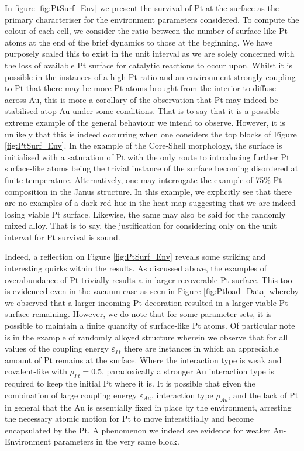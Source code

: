 In figure \ref{fig:PtSurf_Env} we present the survival of Pt at the surface as the primary characteriser for the environment parameters considered. To compute the colour of each cell, we consider the ratio between the number of surface-like Pt atoms at the end of the brief dynamics to those at the beginning. We have purposely scaled this to exist in the unit interval as we are solely concerned with the loss of available Pt surface for catalytic reactions to occur upon.  Whilst it is possible in the instances of a high Pt ratio and an environment strongly coupling to Pt that there may be more Pt atoms brought from the interior to diffuse across Au, this is more a corollary of the observation that Pt may indeed be stabilised atop Au under some conditions. That is to say that it is a possible extreme example of the general behaviour we intend to observe. However, it is unlikely that this is indeed occurring when one considers the top blocks of Figure \ref{fig:PtSurf_Env}. In the example of the Core-Shell morphology, the surface is initialised with a saturation of Pt with the only route to introducing further Pt surface-like atoms being the trivial instance of the surface becoming disordered at finite temperature. Alternatively, one may interrogate the example of 75\% Pt composition in the Janus structure. In this example, we explicitly see that there are no examples of a dark red hue in the heat map suggesting that we are indeed losing viable Pt surface. Likewise, the same may also be said for the randomly mixed alloy. That is to say, the justification for considering only on the unit interval for Pt survival is sound.

Indeed, a reflection on Figure \ref{fig:PtSurf_Env} reveals some striking and interesting quirks within the results. As discussed above, the examples of overabundance of Pt trivially results a in larger recoverable Pt surface. This too is evidenced even in the vacuum case as seen in Figure \ref{fig:Ptload_Data} whereby we observed that a larger incoming Pt decoration resulted in a larger viable Pt surface remaining. However, we do note that for some parameter sets, it is possible to maintain a finite quantity of surface-like Pt atoms. Of particular note is in the example of randomly alloyed structure wherein we observe that for all values of the coupling energy $\varepsilon_{Pt}$ there are instances in which an appreciable amount of Pt remains at the surface. Where the interaction type is weak and covalent-like with $\rho_{Pt}=0.5$, paradoxically a stronger Au interaction type is required to keep the initial Pt where it is. It is possible that given the combination of large coupling energy $\varepsilon_{Au}$, interaction type $\rho_{Au}$, and the lack of Pt in general that the Au is essentially fixed in place by the environment, arresting the necessary atomic motion for Pt to move interstitially and become encapsulated by the Pt. A phenomenon we indeed see evidence for weaker Au-Environment parameters in the very same block.

